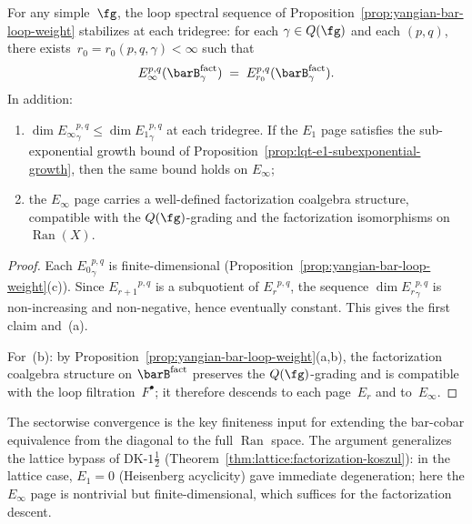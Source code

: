 \begin{theorem}
\label{thm:sectorwise-spectral-convergence}
For any simple~$\fg$, the loop spectral sequence of
Proposition~\ref{prop:yangian-bar-loop-weight} stabilizes at each
tridegree: for each $\gamma \in Q(\fg)$ and each $(p,q)$, there
exists~$r_0 = r_0(p,q,\gamma) < \infty$ such that
\[
E_\infty^{p,q}(\barB_\gamma^{\mathrm{fact}})
\;=\; E_{r_0}^{p,q}(\barB_\gamma^{\mathrm{fact}}).
\]
In addition:
\begin{enumerate}[label=\textup{(\alph*)}]
\item $\dim {E_\infty}^{p,q}_\gamma \le \dim {E_1}^{p,q}_\gamma$ at each
 tridegree. If the $E_1$ page satisfies the sub-exponential
 growth bound of
 Proposition~\ref{prop:lqt-e1-subexponential-growth}, then the
 same bound holds on $E_\infty$;
\item the $E_\infty$ page carries a well-defined factorization
 coalgebra structure, compatible with the $Q(\fg)$-grading
 and the factorization isomorphisms on
 $\operatorname{Ran}(X)$.
\end{enumerate}
\end{theorem}

\begin{proof}
Each ${E_0}^{p,q}_\gamma$ is finite-dimensional
(Proposition~\ref{prop:yangian-bar-loop-weight}(c)). Since
${E_{r+1}}^{p,q}$ is a subquotient of ${E_r}^{p,q}$, the sequence
$\dim {E_r}^{p,q}_\gamma$ is non-increasing and non-negative, hence
eventually constant. This gives the first claim and~(a).

For~(b): by Proposition~\ref{prop:yangian-bar-loop-weight}(a,b),
the factorization coalgebra structure on $\barB^{\mathrm{fact}}$
preserves the $Q(\fg)$-grading and is compatible with the loop
filtration~$F^\bullet$; it therefore descends to each page~$E_r$
and to~$E_\infty$.
\end{proof}

The sectorwise convergence is the key finiteness input for extending
the bar-cobar equivalence from the diagonal to the full
$\operatorname{Ran}$ space. The argument generalizes the
lattice bypass of DK-$1\frac{1}{2}$
(Theorem~\ref{thm:lattice:factorization-koszul}): in the lattice
case, $E_1 = 0$ (Heisenberg acyclicity) gave immediate degeneration;
here the $E_\infty$ page is nontrivial but finite-dimensional, which
suffices for the factorization descent.

